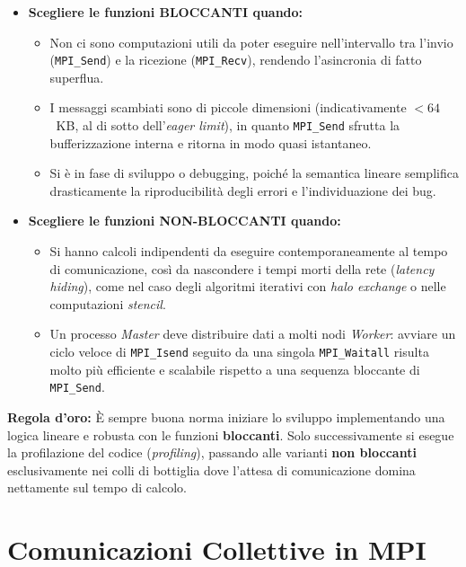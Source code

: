 \begin{itemize}
    \item \textbf{Scegliere le funzioni BLOCCANTI quando:}
    \begin{itemize}
        \item Non ci sono computazioni utili da poter eseguire nell'intervallo tra l'invio (\texttt{MPI\_Send}) e la ricezione (\texttt{MPI\_Recv}), rendendo l'asincronia di fatto superflua.
        \item I messaggi scambiati sono di piccole dimensioni (indicativamente $< 64$~KB, al di sotto dell'\textit{eager limit}), in quanto \texttt{MPI\_Send} sfrutta la bufferizzazione interna e ritorna in modo quasi istantaneo.
        \item Si è in fase di sviluppo o debugging, poiché la semantica lineare semplifica drasticamente la riproducibilità degli errori e l'individuazione dei bug.
    \end{itemize}
    
    \item \textbf{Scegliere le funzioni NON-BLOCCANTI quando:}
    \begin{itemize}
        \item Si hanno calcoli indipendenti da eseguire contemporaneamente al tempo di comunicazione, così da nascondere i tempi morti della rete (\textit{latency hiding}), come nel caso degli algoritmi iterativi con \textit{halo exchange} o nelle computazioni \textit{stencil}.
        \item Un processo \textit{Master} deve distribuire dati a molti nodi \textit{Worker}: avviare un ciclo veloce di \texttt{MPI\_Isend} seguito da una singola \texttt{MPI\_Waitall} risulta molto più efficiente e scalabile rispetto a una sequenza bloccante di \texttt{MPI\_Send}.
    \end{itemize}
\end{itemize}

\textbf{Regola d'oro:} È sempre buona norma iniziare lo sviluppo implementando una logica lineare e robusta con le funzioni \textbf{bloccanti}. Solo successivamente si esegue la profilazione del codice (\textit{profiling}), passando alle varianti \textbf{non bloccanti} esclusivamente nei colli di bottiglia dove l'attesa di comunicazione domina nettamente sul tempo di calcolo.

\section{Comunicazioni Collettive in MPI}

